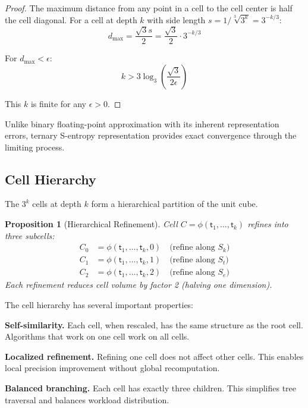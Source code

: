 \documentclass[twocolumn,10pt]{article}
\newtheorem{proposition}[theorem]{Proposition}
\theoremstyle{remark}
\newcommand{\Sk}{S_k}
\newcommand{\St}{S_t}
\newcommand{\Se}{S_e}
\newcommand{\tmark}{\mathsf{t}}
\begin{document}
\begin{proof}
The maximum distance from any point in a cell to the cell center is half the cell diagonal. For a cell at depth $k$ with side length $s = 1/\sqrt[3]{3^k} = 3^{-k/3}$:
\begin{equation}
d_{\max} = \frac{\sqrt{3}s}{2} = \frac{\sqrt{3}}{2} \cdot 3^{-k/3}
\end{equation}

For $d_{\max} < \epsilon$:
\begin{equation}
k > 3\log_3\left(\frac{\sqrt{3}}{2\epsilon}\right)
\end{equation}

This $k$ is finite for any $\epsilon > 0$.
\end{proof}

Unlike binary floating-point approximation with its inherent representation errors, ternary S-entropy representation provides exact convergence through the limiting process.

\subsection{Cell Hierarchy}

The $3^k$ cells at depth $k$ form a hierarchical partition of the unit cube.

\begin{proposition}[Hierarchical Refinement]
Cell $C = \phi(\tmark_1, \ldots, \tmark_k)$ refines into three subcells:
\begin{align}
C_0 &= \phi(\tmark_1, \ldots, \tmark_k, 0) \quad \text{(refine along } \Sk) \\
C_1 &= \phi(\tmark_1, \ldots, \tmark_k, 1) \quad \text{(refine along } \St) \\
C_2 &= \phi(\tmark_1, \ldots, \tmark_k, 2) \quad \text{(refine along } \Se)
\end{align}
Each refinement reduces cell volume by factor 2 (halving one dimension).
\end{proposition}

The cell hierarchy has several important properties:

\textbf{Self-similarity.} Each cell, when rescaled, has the same structure as the root cell. Algorithms that work on one cell work on all cells.

\textbf{Localized refinement.} Refining one cell does not affect other cells. This enables local precision improvement without global recomputation.

\textbf{Balanced branching.} Each cell has exactly three children. This simplifies tree traversal and balances workload distribution.
\end{document}
